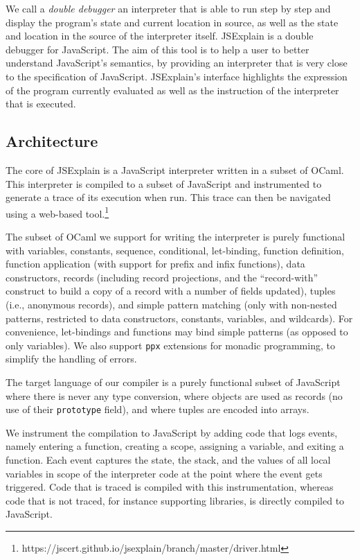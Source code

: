 \documentclass[twocolumn]{article}
\begin{document}
We call a \emph{double debugger} an interpreter that is able to run step by step
and display the program's state and current location in source, as well as the
state and location in the source of the interpreter itself. JSExplain is a
double debugger for JavaScript. The aim of this tool is to help a user to better
understand JavaScript's semantics, by providing an interpreter that is very
close to the specification of JavaScript. JSExplain's interface highlights the
expression of the program currently evaluated as well as the instruction of the
interpreter that is executed.

\subsection{Architecture}

The core of JSExplain is a JavaScript interpreter written in a subset of OCaml.
This interpreter is compiled to a subset of JavaScript and instrumented to
generate a trace of its execution when run. This trace can then be navigated
using a web-based
tool.\footnote{https://jscert.github.io/jsexplain/branch/master/driver.html}

The subset of OCaml we support for writing the interpreter is purely functional
with variables, constants, sequence, conditional, let-binding, function
definition, function application (with support for prefix and infix functions),
data constructors, records (including record projections, and the
``record-with'' construct to build a copy of a record with a number of fields
updated), tuples (i.e., anonymous records), and simple pattern matching (only
with non-nested patterns, restricted to data constructors, constants, variables,
and wildcards). For convenience, let-bindings and functions may bind simple
patterns (as opposed to only variables). We also support \texttt{ppx} extensions
for monadic programming, to simplify the handling of errors.

The target language of our compiler is a purely functional subset of JavaScript
where there is never any type conversion, where objects are used as records (no
use of their \texttt{prototype} field), and where tuples are encoded into
arrays.

We instrument the compilation to JavaScript by adding code that logs events,
namely entering a function, creating a scope, assigning a variable, and exiting
a function. Each event captures the state, the stack, and the values of all
local variables in scope of the interpreter code at the point where the event
gets triggered. Code that is traced is compiled with this instrumentation,
whereas code that is not traced, for instance supporting libraries, is directly
compiled to JavaScript.
\end{document}
